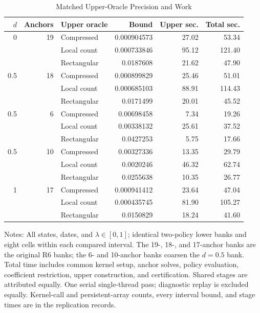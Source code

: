\begin{table}[!htbp]
\centering\small
\caption{Matched Upper-Oracle Precision and Work}
\label{tab:r7_matched}
\begin{tabular}{rrlrrr}
\toprule
$d$ & Anchors & Upper oracle & Bound & Upper sec. & Total sec. \\
\midrule
0 & 19 & Compressed & 0.000904573 & 27.02 & 53.34 \\
 &  & Local count & 0.000733846 & 95.12 & 121.40 \\
 &  & Rectangular & 0.0187608 & 21.62 & 47.90 \\
0.5 & 18 & Compressed & 0.000899829 & 25.46 & 51.01 \\
 &  & Local count & 0.000685103 & 88.91 & 114.43 \\
 &  & Rectangular & 0.0171499 & 20.01 & 45.52 \\
0.5 & 6 & Compressed & 0.00698458 & 7.34 & 19.26 \\
 &  & Local count & 0.00338132 & 25.61 & 37.52 \\
 &  & Rectangular & 0.0427253 & 5.75 & 17.66 \\
0.5 & 10 & Compressed & 0.00327336 & 13.35 & 29.79 \\
 &  & Local count & 0.0020246 & 46.32 & 62.74 \\
 &  & Rectangular & 0.0255638 & 10.35 & 26.77 \\
1 & 17 & Compressed & 0.000941412 & 23.64 & 47.04 \\
 &  & Local count & 0.000435745 & 81.90 & 105.27 \\
 &  & Rectangular & 0.0150829 & 18.24 & 41.60 \\
\bottomrule
\end{tabular}
\par\smallskip
\begin{minipage}{0.98\linewidth}\footnotesize
Notes: All states, dates, and $\lambda\in[0,1]$; identical two-policy lower banks and eight cells within each compared interval. The 19-, 18-, and 17-anchor banks are the original R6 banks; the 6- and 10-anchor banks coarsen the $d=0.5$ bank. Total time includes common kernel setup, anchor solves, policy evaluation, coefficient restriction, upper construction, and certification. Shared stages are attributed equally. One serial single-thread pass; diagnostic replay is excluded equally. Kernel-call and persistent-array counts, every interval bound, and stage times are in the replication records.
\end{minipage}
\end{table}
